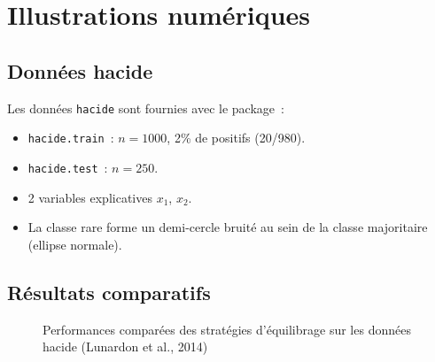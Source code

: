 \documentclass[a4paper,11pt]{article}
\theoremstyle{definition}
\begin{document}
\section{Illustrations num\'eriques}

\subsection{Donn\'ees hacide}

Les donn\'ees \texttt{hacide} sont fournies avec le package~:
\begin{itemize}
  \item \texttt{hacide.train}~: $n=1000$, 2\% de positifs (20/980).
  \item \texttt{hacide.test}~: $n=250$.
  \item 2 variables explicatives $x_1$, $x_2$.
  \item La classe rare forme un demi-cercle bruit\'e au sein de la
    classe majoritaire (ellipse normale).
\end{itemize}

\subsection{R\'esultats comparatifs}

\begin{figure}[h]
\centering
{}
\caption{Performances compar\'ees des strat\'egies d'\'equilibrage
sur les donn\'ees hacide (Lunardon et al., 2014)}
\end{figure}
\end{document}
